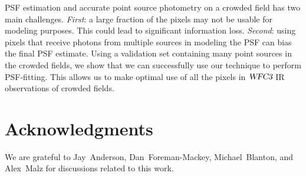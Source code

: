 PSF estimation and accurate point source photometry on a crowded field has two main challenges. \emph{First}: a large fraction of the pixels may not be usable for modeling purposes. This could lead to  significant information loss. \emph{Second}: using pixels that receive photons from multiple sources in modeling the PSF can bias the final PSF estimate. 
Using a validation set containing many point sources in the crowded fields, we show that we can successfully use our technique to perform PSF-fitting. 
This allows us to make optimal use of all the pixels in ${\textsl{WFC3}}$ IR observations of crowded fields.

\section*{Acknowledgments}

We are grateful to Jay~Anderson, Dan~Foreman-Mackey, Michael~Blanton, and Alex~Malz for discussions related to this work.




